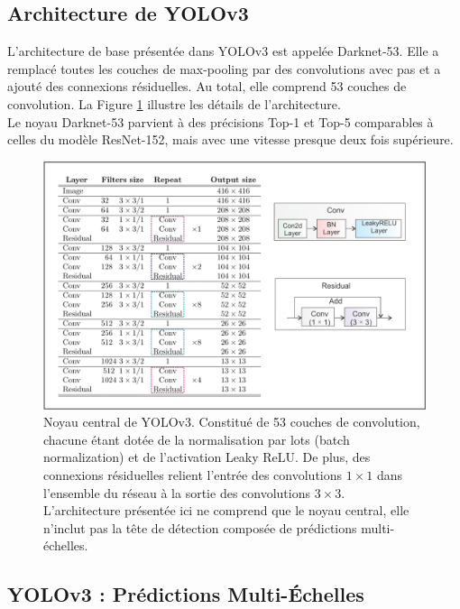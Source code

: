 \documentclass{article}
\begin{document}
\subsection{Architecture de YOLOv3}
\label{sect:1}

L'architecture de base présentée dans YOLOv3 est appelée Darknet-53. Elle a remplacé toutes les couches de max-pooling par des convolutions avec pas et a ajouté des connexions résiduelles. Au total, elle comprend 53 couches de convolution. La Figure \ref{fig:v3} illustre les détails de l'architecture.
\vspace{.2cm}\\
Le noyau Darknet-53 parvient à des précisions Top-1 et Top-5 comparables à celles du modèle ResNet-152, mais avec une vitesse presque deux fois supérieure.

\begin{figure}[htbp]
    \centering
    \includegraphics[scale=0.25]{Figures/v3.png}
    \caption{Noyau central de YOLOv3. Constitué de 53 couches de convolution, chacune étant dotée de la normalisation par lots (batch normalization) et de l'activation Leaky ReLU. De plus, des connexions résiduelles relient l'entrée des convolutions $1 \times 1$ dans l'ensemble du réseau à la sortie des convolutions $3 \times 3$. L'architecture présentée ici ne comprend que le noyau central, elle n'inclut pas la tête de détection composée de prédictions multi-échelles.}
    \label{fig:v3}
\end{figure}
\vspace{0.6cm}


\subsection{YOLOv3 : Prédictions Multi-Échelles}
\label{sect:2}
\end{document}
